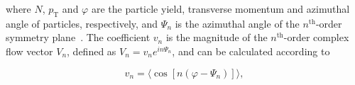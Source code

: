 \documentclass[ALICE,manyauthors]{cernphprep}
\begin{document}
\noindent where $N$, $p_{\mathrm{T}}$ and $\varphi$ are the particle yield, transverse momentum and azimuthal angle of particles, respectively, and $\Psi_n$ is the azimuthal angle of the $n^{\mathrm{th}}$-order symmetry plane~\cite{Voloshin:2006gz,Bhalerao:2006tp,Alver:2008zza,Alver:2010gr,Alver:2010dn}. The coefficient $v_{n}$ is the magnitude of the $n^{\mathrm{th}}$-order complex flow vector $V_n$, defined as $V_{n} = v_{n}e^{in\Psi_n}$, and can be calculated according to 


\begin{equation}
v_{n} = \langle{\cos[n(\varphi - \Psi_n)]}\rangle,
\label{Eq:vn}
\end{equation}
\end{document}
